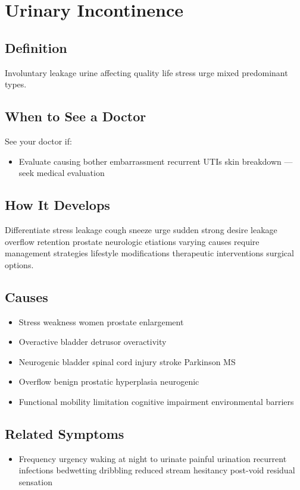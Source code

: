 \chapter{Urinary Incontinence}

\section*{Definition}
Involuntary leakage urine affecting quality life stress urge mixed predominant types.

\section*{When to See a Doctor}
See your doctor if:
\begin{itemize}
  \item Evaluate causing bother embarrassment recurrent UTIs skin breakdown — seek medical evaluation
\end{itemize}

\section*{How It Develops}
Differentiate stress leakage cough sneeze urge sudden strong desire leakage overflow retention prostate neurologic etiations varying causes require management strategies lifestyle modifications therapeutic interventions surgical options.

\section*{Causes}
\begin{itemize}
  \item Stress weakness women prostate enlargement
  \item Overactive bladder detrusor overactivity
  \item Neurogenic bladder spinal cord injury stroke Parkinson MS
  \item Overflow benign prostatic hyperplasia neurogenic
  \item Functional mobility limitation cognitive impairment environmental barriers
\end{itemize}

\section*{Related Symptoms}
\begin{itemize}
  \item Frequency urgency waking at night to urinate painful urination recurrent infections bedwetting dribbling reduced stream hesitancy post-void residual sensation
\end{itemize}

